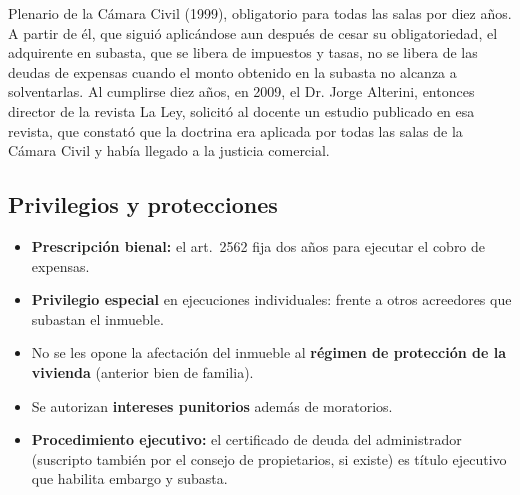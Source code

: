 \documentclass[12pt,oneside]{book}
\begin{document}
Plenario de la Cámara Civil (1999), obligatorio para todas las salas por diez años. A partir de él, que siguió aplicándose aun después de cesar su obligatoriedad, el adquirente en subasta, que se libera de impuestos y tasas, no se libera de las deudas de expensas cuando el monto obtenido en la subasta no alcanza a solventarlas. %
Al cumplirse diez años, en 2009, el Dr. Jorge Alterini, entonces director de la revista La Ley, solicitó al docente un estudio publicado en esa revista, que constató que la doctrina era aplicada por todas las salas de la Cámara Civil y había llegado a la justicia comercial.

\subsection{Privilegios y protecciones}

\begin{itemize}
    \item \textbf{Prescripción bienal:} el art.~2562 fija dos años para ejecutar el cobro de expensas.
    \item \textbf{Privilegio especial} en ejecuciones individuales: frente a otros acreedores que subastan el inmueble.
    \item No se les opone la afectación del inmueble al \textbf{régimen de protección de la vivienda} (anterior bien de familia).
    \item Se autorizan \textbf{intereses punitorios} además de moratorios.
    \item \textbf{Procedimiento ejecutivo:} el certificado de deuda del administrador (suscripto también por el consejo de propietarios, si existe) es título ejecutivo que habilita embargo y subasta.
\end{itemize}
\end{document}

